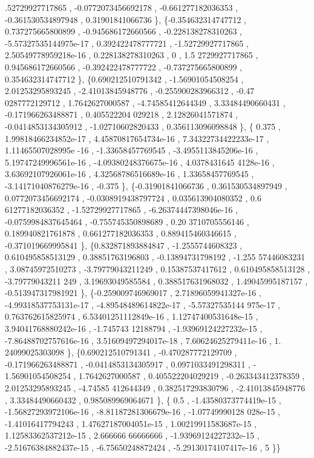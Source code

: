 \begin{DoxyCode}
      .52729927717865 , -0.0772073456692178 , -0.661277182036353 , -0.361530534897948 ,  0.31901841066736 \},
\{-0.354632314747712 , 0.737275665800899 , -0.945686172660566 , -0.228138278310263 , -5.57327535144975e-17 ,
       0.392422478777721 , -1.52729927717865 , 2.50549778959218e-16 , 0.228138278310263 ,                 0 ,  1.5
      2729927717865 , 0.945686172660566 , -0.392422478777722 , -0.737275665800899 , 0.354632314747712 \},
\{0.690212510791342 , -1.56901054508254 ,  2.01253295893245 , -2.41013845948776 , -0.255900283966312 , -0.47
      0287772129712 ,   1.7642627000587 , -4.74585412644349 ,  3.33484490660431 , -0.171966263488871 , 0.405522204
      029218 ,  2.12826041571874 , -0.0414853134305912 , -1.02710602820433 , 0.356113096098848 \},
\{            0.375 , 1.99818466234852e-17 , 4.45870817654734e-16 , 7.34322734422233e-17 , 1.11465507028995e
      -16 , -1.33658457769545 , -3.4955113845206e-16 , 5.19747249996561e-16 , -4.09380248376675e-16 , 4.0378431645
      4128e-16 , 3.63692107926061e-16 , 4.32568786516689e-16 ,  1.33658457769545 , -3.14171040876279e-16 ,        
          -0.375 \},
\{-0.31901841066736 , 0.361530534897949 , 0.0772073456692174 , -0.0308919438797724 , 0.035613904080352 , 0.6
      61277182036352 , -1.52729927717865 , -6.26374447398046e-16 , -0.0759984837645464 , -0.755745350898689 , 0.20
      3710705556146 , 0.189940821761878 , 0.661277182036353 , 0.889415460346615 , -0.371019669995841 \},
\{0.832871893884847 ,  -1.2555744608323 , 0.610495858513129 ,  0.38851763196803 , -0.13894731798192 , -1.255
      57446083231 ,  3.08745972510273 , -3.79779043211249 ,  0.15387537417612 , 0.610495858513128 , -3.79779043211
      249 ,  3.19693049585584 , 0.388517631968032 ,  1.49045995187157 , -0.513947317981921 \},
\{-0.259009746969017 , 2.71896059941327e-16 , -4.99318537753131e-17 , -4.89548489614822e-17 , -5.57327535144
      975e-17 , 0.763762615825974 , 6.53401251112849e-16 , 1.12747400531648e-15 , 3.94041768880242e-16 , -1.745743
      12188794 , -1.93969124227232e-15 , -7.86488702757616e-16 , 3.51609497294017e-18 , 7.60624625279411e-16 ,  1.
      24099025303098 \},
\{0.690212510791341 , -0.470287772129709 , -0.171966263488871 , -0.0414853134305917 , 0.0971033491298311 , -
      1.56901054508254 ,   1.7642627000587 , 0.405522204029219 , -0.263343412378359 ,  2.01253295893245 , -4.74585
      412644349 , 0.382517293830796 , -2.41013845948776 ,  3.33484490660432 , 0.985089969064671 \},
\{              0.5 , -1.43580373774419e-15 , -1.56827293972106e-16 , -8.81187281306679e-16 , -1.07749990128
      028e-15 , -1.41016417794243 , 1.47627187004051e-15 , 1.00219911583687e-15 , 1.12583362537212e-15 ,  2.666666
      66666666 , -1.93969124227232e-15 , -2.51676384882437e-15 , -6.75650248872424 , -5.29130174107417e-16 ,      
                 5 \}\}
\end{DoxyCode}
\mbox{\label{a00515_a704fa8b9733c702ccc04c6c323f3dfa6}} 
